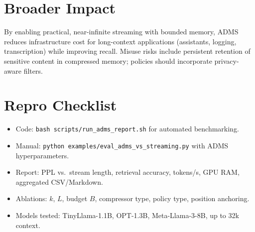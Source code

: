 \documentclass[11pt]{article}
\newcommand{\model}{\textsc{ADMS}} %
\begin{document}
\section{Broader Impact}
By enabling practical, near-infinite streaming with bounded memory, \model{} reduces infrastructure cost for long-context applications (assistants, logging, transcription) while improving recall. Misuse risks include persistent retention of sensitive content in compressed memory; policies should incorporate privacy-aware filters.

\section*{Repro Checklist}
\begin{itemize}
  \item Code: \texttt{bash scripts/run\_adms\_report.sh} for automated benchmarking.
  \item Manual: \texttt{python examples/eval\_adms\_vs\_streaming.py} with ADMS hyperparameters.
  \item Report: PPL vs.\ stream length, retrieval accuracy, tokens/s, GPU RAM, aggregated CSV/Markdown.
  \item Ablations: $k$, $L$, budget $B$, compressor type, policy type, position anchoring.
  \item Models tested: TinyLlama-1.1B, OPT-1.3B, Meta-Llama-3-8B, up to 32k context.
\end{itemize}
\end{document}
